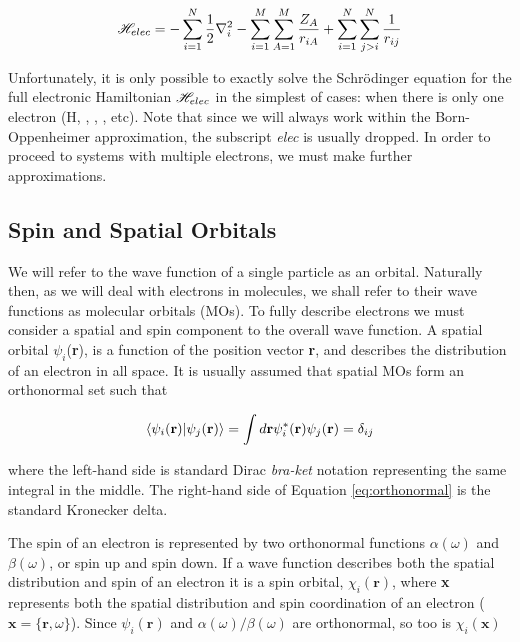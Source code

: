 \begin{equation}
  \mathscr{H}_{elec} = -\sum_{i=1}^N \frac{1}{2}\nabla_i^2  -\sum_{i=1}^M\sum_{A=1}^M\frac{Z_A}{r_{iA}}
  + \sum_{i=1}^N\sum_{j>i}^N \frac{1}{r_{ij}}
\label{eq:hamelect}
\end{equation}

\noindent Unfortunately, it is only possible to exactly solve the Schr{\"o}dinger
equation for the full electronic Hamiltonian $\mathscr{H}_{elec}$ in the simplest of
cases: when there is only one electron (H, , , ,
etc). Note that since we will always work within the Born-Oppenheimer
approximation, the subscript \emph{elec} is usually dropped.  In order to
proceed to systems with multiple electrons, we must make further approximations.

\subsection{Spin and Spatial Orbitals}

We will refer to the wave function of a single particle as an orbital. Naturally
then, as we will deal with electrons in molecules, we shall refer to their wave
functions as molecular orbitals (MOs). To fully describe electrons we must
consider a spatial and spin component to the overall wave function. A spatial
orbital $\psi_i$(\textbf{r}), is a function of the position vector \textbf{r},
and describes the distribution of an electron in all space. It is usually
assumed that spatial MOs form an orthonormal set such that

\begin{equation}
\bra{\psi_i(\mathbf{r})}\ket{\psi_j(\mathbf{r})} =
\int d\mathbf{r} \psi_i^*(\mathbf{r})\psi_j(\mathbf{r}) = \delta_{ij}
\label{eq:orthonormal}
\end{equation}

\noindent where the left-hand side is standard Dirac \emph{bra-ket} notation
representing the same integral in the middle. The right-hand side of Equation
\ref{eq:orthonormal} is the standard Kronecker delta.

The spin of an electron is represented by two orthonormal functions
$\alpha(\omega)$ and $\beta(\omega)$, or spin up and spin down. If a wave
function describes both the spatial distribution and spin of an electron it is a
spin orbital, $\chi_i(\mathbf{r})$, where \textbf{x} represents both the spatial
distribution and spin coordination of an electron
($\mathbf{x} = \{ \mathbf{r}, \omega \}$). Since $\psi_i(\mathbf{r})$ and
$\alpha(\omega)/\beta(\omega)$ are orthonormal, so too is $\chi_i(\mathbf{x})$

